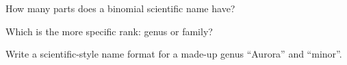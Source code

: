 \begin{exercise}[$\star$]\label{exo:g6:classification:3}
How many parts does a binomial scientific name have?
\end{exercise}

\begin{exercise}[$\star$]\label{exo:g6:classification:4}
Which is the more specific rank: genus or family?
\end{exercise}

\begin{exercise}[$\star\star$]\label{exo:g6:classification:5}
Write a scientific-style name format for a made-up genus ``Aurora'' and
 ``minor''.
\end{exercise}

